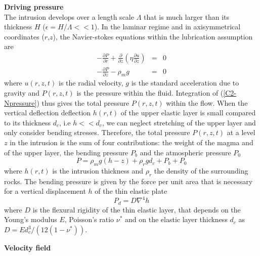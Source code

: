 \textbf{Driving pressure}\\

The  intrusion develops  over a  length scale  $\Lambda$ that  is much
larger than its  thickness $H$ ($\epsilon = H/ \Lambda<<  1$).  In the
laminar  regime  and  in  axisymmetrical  coordinates  ($r$,$z$),  the
Navier-stokes equations within the lubrication assumption are
\begin{eqnarray}
  -\frac{\partial P}{\partial r}  +  \frac{\partial}{\partial z}\left(\eta \frac{\partial u}{\partial z}\right) &=&0\label{C2_V1} \\
  -\frac{\partial P}{\partial z}  - \rho_{m}g&  =&0\label{C2-Npressure}
\end{eqnarray}
where  $u(r,z,t)$  is  the  radial   velocity,  $g$  is  the  standard
acceleration due to gravity and  $P(r,z,t)$ is the pressure within the
fluid.   Integration  of  (\ref{C2-Npressure}) thus  gives  the  total
pressure  $P(r,z,t)$ within  the flow.   When the  vertical deflection
deflection $h(r,t)$  of the upper  elastic layer is small  compared to
its thickness  $d_c$, i.e $h<<d_c$,  we can neglect stretching  of the
upper layer and only consider  bending stresses.  Therefore, the total
pressure $P(r,z,t)$ at a level $z$ in the intrusion is the sum of four
contributions: the  weight of the  magma and  of the upper  layer, the
bending pressure $P_b$ and the atmospheric pressure $P_0$
\begin{equation}
  P = \rho_m g (h-z)+\rho_rgd_c+P_b+P_0
  \label{C2-pression}
\end{equation}
where $h(r,t)$ is the intrusion  thickness and $\rho_r$ the density of
the surrounding rocks. The bending pressure  is given by the force per
unit area  that is necessary  for a  vertical displacement $h$  of the
thin elastic plate \citep{Turcotte:1982ca}
\begin{equation}
  P_d = D\nabla^4h
\end{equation}
where $D$  is the flexural  rigidity of  the thin elastic  layer, that
depends on the Young's modulus $E$, Poisson's ratio $\nu^*$ and on the
elastic           layer          thickness           $d_c$          as
$D = Ed_c^3/\left(12(1-\nu^*)\right)$.

\vspace{.5cm} \textbf{Velocity field} \vspace{.5cm}

